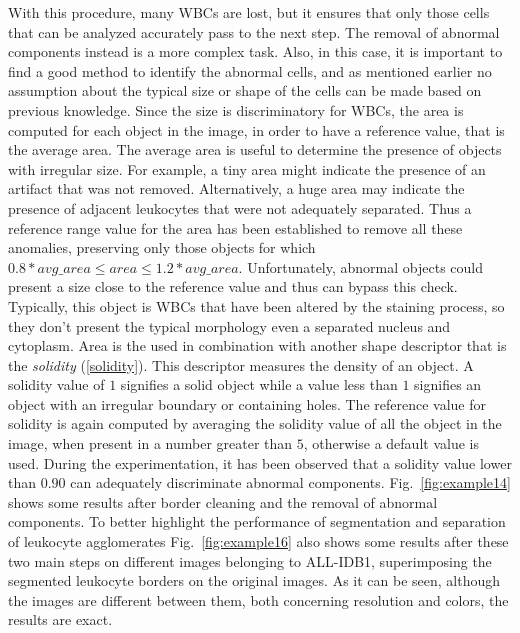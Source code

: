 \documentclass[final,a4paper,12pt,english]{UnicaPhdThesis3}
\begin{document}
{With this procedure, many WBCs are lost, but it ensures that only those cells that can be analyzed accurately pass to the next step. The removal of abnormal components instead is a more complex task. Also, in this case, it is important to find a good method to identify the abnormal cells, and as mentioned earlier no assumption about the typical size or shape of the cells can be made based on previous knowledge. Since the size is discriminatory for WBCs, the area is computed for each object in the image, in order to have a reference value, that is the average area. The average area is useful to determine the presence of objects with irregular size. For example, a tiny area might indicate the presence of an artifact that was not removed. Alternatively, a huge area may indicate the presence of adjacent leukocytes that were not adequately separated. Thus a reference range value for the area has been established to remove all these anomalies, preserving only those objects for which $0.8*avg\_area \leq area \leq 1.2*avg\_area$. Unfortunately, abnormal objects could present a size close to the reference value and thus can bypass this check. Typically, this object is WBCs that have been altered by the staining process, so they don't present the typical morphology even a separated nucleus and cytoplasm. Area is the used in combination with another shape descriptor that is the \textit{solidity} (\ref{solidity}). This descriptor measures the density of an object.
A solidity value of $1$ signifies a solid object while a value less than $1$ signifies an object with an irregular boundary or containing holes. The reference value for solidity is again computed by averaging the solidity value of all the object in the image, when present in a number greater than $5$, otherwise a default value is used. During the experimentation, it has been observed that a solidity value lower than $0.90$ can adequately discriminate abnormal components. Fig.~\ref{fig:example14}  shows some results after border cleaning and the removal of abnormal components. To better highlight the performance of segmentation and separation of leukocyte agglomerates Fig.~\ref{fig:example16} also shows some results after these two main steps on different images belonging to ALL-IDB1, superimposing the segmented leukocyte borders on the original images. As it can be seen, although the images are different between them, both concerning resolution and colors, the results are exact.

}
\end{document}
